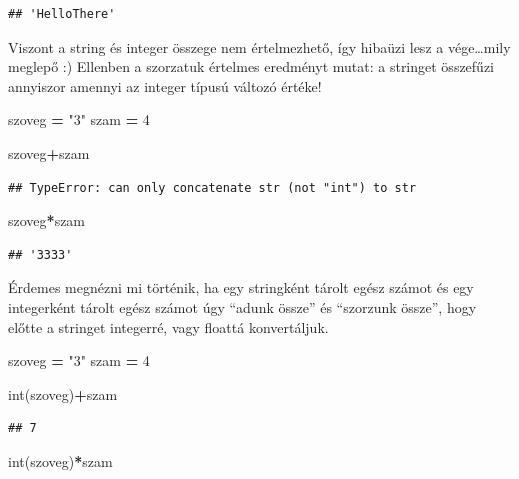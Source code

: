 \documentclass[
]{book}
\newenvironment{Shaded}{\begin{snugshade}}{\end{snugshade}}
\newcommand{\BuiltInTok}[1]{#1}
\newcommand{\DecValTok}[1]{\textcolor[rgb]{0.00,0.00,0.81}{#1}}
\newcommand{\NormalTok}[1]{#1}
\newcommand{\OperatorTok}[1]{\textcolor[rgb]{0.81,0.36,0.00}{\textbf{#1}}}
\newcommand{\StringTok}[1]{\textcolor[rgb]{0.31,0.60,0.02}{#1}}
\begin{document}
\begin{verbatim}
## 'HelloThere'
\end{verbatim}

Viszont a string és integer összege nem értelmezhető, így hibaüzi lesz a vége\ldots mily meglepő :)
Ellenben a szorzatuk értelmes eredményt mutat: a stringet összefűzi annyiszor amennyi az integer típusú változó értéke!

\begin{Shaded}
\begin{Highlighting}[]
\NormalTok{szoveg }\OperatorTok{=} \StringTok{"3"}
\NormalTok{szam }\OperatorTok{=} \DecValTok{4}

\NormalTok{szoveg}\OperatorTok{+}\NormalTok{szam}
\end{Highlighting}
\end{Shaded}

\begin{verbatim}
## TypeError: can only concatenate str (not "int") to str
\end{verbatim}

\begin{Shaded}
\begin{Highlighting}[]
\NormalTok{szoveg}\OperatorTok{*}\NormalTok{szam}
\end{Highlighting}
\end{Shaded}

\begin{verbatim}
## '3333'
\end{verbatim}

Érdemes megnézni mi történik, ha egy stringként tárolt egész számot és egy integerként tárolt egész számot úgy ``adunk össze'' és ``szorzunk össze'', hogy előtte a stringet integerré, vagy floattá konvertáljuk.

\begin{Shaded}
\begin{Highlighting}[]
\NormalTok{szoveg }\OperatorTok{=} \StringTok{"3"}
\NormalTok{szam }\OperatorTok{=} \DecValTok{4}

\BuiltInTok{int}\NormalTok{(szoveg)}\OperatorTok{+}\NormalTok{szam}
\end{Highlighting}
\end{Shaded}

\begin{verbatim}
## 7
\end{verbatim}

\begin{Shaded}
\begin{Highlighting}[]
\BuiltInTok{int}\NormalTok{(szoveg)}\OperatorTok{*}\NormalTok{szam}
\end{Highlighting}
\end{Shaded}
\end{document}
